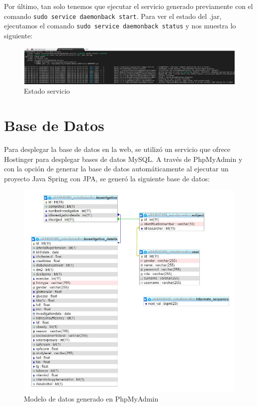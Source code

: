      \FloatBarrier
    
    Por último, tan solo tenemos que ejecutar el servicio generado previamente con el comando \texttt{sudo service daemonback start}. Para ver el estado del .jar, ejecutamos el comando \texttt{sudo service daemonback status} y nos muestra lo siguiente:
    
    \begin{figure}[h]
    \centering
     \includegraphics[width=1\textwidth]{images/serviciostart}
    \caption{Estado servicio}
    \end{figure}
    
    
    


    
    \section{Base de Datos}
    Para desplegar la base de datos en la web, se utilizó un servicio que ofrece Hostinger para desplegar bases de datos MySQL. 
    \newline 
    A través de PhpMyAdmin y con la opción de generar la base de datos automáticamente al ejecutar un proyecto Java Spring con JPA, se generó la siguiente base de datos:
    
     \begin{figure}[h]
    \centering
     \includegraphics[width=1\textwidth]{images/modelodatos}
    \caption{Modelo de datos generado en PhpMyAdmin}
    \end{figure}
    
    
